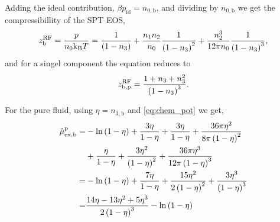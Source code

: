 \documentclass[12pt, letterpaper]{article}
\newcommand*{\lb}{\ensuremath{\left(}}
\newcommand*{\rb}{\ensuremath{\right)}}
\newcommand{\RF}{\ensuremath{\text{RF}}\xspace}
\newcommand{\excess}{\ensuremath{\text{ex}}\xspace}
\newcommand{\ideal}{\ensuremath{\text{id}}\xspace}
\newcommand{\kB}{\ensuremath{\text{k}_{\text{B}}}\xspace}
\newcommand{\bulk}{\ensuremath{\text{b}}\xspace}
\newcommand{\pure}{\ensuremath{\text{p}}\xspace}
\begin{document}
Adding the ideal contribution, $\beta p_{\ideal} = n_{0,\bulk}$, and
dividing by $n_{0,\bulk}$ we get the compressibillity of the SPT EOS,
\begin{equation}
  z^\RF_\bulk = \frac{p}{n_0 \kB T} = \frac{1}{\lb 1 - n_3 \rb} + \frac{n_1 n_2}{n_0} \frac{1}{\lb 1 - n_3 \rb^2} + \frac{n_2^3}{12 \pi n_0} \frac{1}{\lb 1 - n_3 \rb^3},
\end{equation}
and for a singel component the equation reduces to
\begin{equation}
  z^\RF_{\bulk,\pure} = \frac{1 + n_3 + n_3^2}{\lb 1 - n_3 \rb^3}.
\end{equation}

For the pure fluid, using $\eta = n_{3,\bulk}$ and \eqref{eq:chem_pot} we get,
\begin{align}
  \hat{\mu}^\pure_{\excess,\bulk} =& -\ln \lb 1 - \eta \rb + \frac{3 \eta}{1 - \eta} + \frac{3 \eta}{1 - \eta} + \frac{36\pi\eta^2}{8\pi \lb 1 - \eta \rb^2}\nonumber \\
  & +\frac{\eta}{1 - \eta} +
  \frac{3 \eta^2}{\lb 1 - \eta \rb^2} +
    \frac{36\pi\eta^3}{12\pi \lb 1 - \eta \rb^3}\nonumber \\
   =&-\ln \lb 1 - \eta \rb + \frac{7 \eta}{1 - \eta} + \frac{15\eta^2}{2\lb 1 - \eta \rb^2}+
      \frac{3\eta^3}{\lb 1 - \eta \rb^3}\nonumber \\
  =&\frac{14\eta - 13\eta^2 + 5\eta^3}{2\lb 1 - \eta \rb^3}-\ln \lb 1 - \eta \rb
\end{align}

\clearpage


\end{document}
